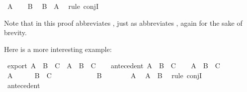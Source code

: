\begin{isabellebody}
\ {\isachardoublequoteopen}A{\isachardoublequoteclose}\isacommand{{\isachardot}{\isachardot}}\isamarkupfalse%
\isanewline
\ \ \isamarkupfalse%
\ {\isacharbackquoteopen}B{\isacharbackquoteclose}\ \isamarkupfalse%
\ {\isachardoublequoteopen}B\ {\isasymand}\ A{\isachardoublequoteclose}\ \isamarkupfalse%
\ {\isacharparenleft}rule\ conjI{\isacharparenright}\isanewline
{}\isamarkupfalse%
%
\endisatagproof
{\isafoldproof}%
%
\isadelimproof
%
\endisadelimproof
%
\begin{isamarkuptext}%
Note that  in this proof abbreviates , just as 
abbreviates , again for the sake of brevity.%
\end{isamarkuptext}\isamarkuptrue%
%
\begin{isamarkuptext}%
Here is a more interesting example:%
\end{isamarkuptext}\isamarkuptrue%
\isamarkupfalse%
\ export{\isacharcolon}\ {\isachardoublequoteopen}{\isacharparenleft}A\ {\isasymand}\ B\ {\isasymlongrightarrow}\ C{\isacharparenright}\ {\isasymlongrightarrow}\ {\isacharparenleft}A\ {\isasymlongrightarrow}\ B\ {\isasymlongrightarrow}\ C{\isacharparenright}{\isachardoublequoteclose}\isanewline
%
\isadelimproof
%
\endisadelimproof
%
\isatagproof
{}\isamarkupfalse%
\isanewline
\ \ \isamarkupfalse%
\ antecedent{\isacharcolon}\ {\isachardoublequoteopen}A\ {\isasymand}\ B\ {\isasymlongrightarrow}\ C{\isachardoublequoteclose}\isanewline
\ \ \isamarkupfalse%
\ {\isachardoublequoteopen}A\ {\isasymlongrightarrow}\ B\ {\isasymlongrightarrow}\ C{\isachardoublequoteclose}\isanewline
\ \ \isamarkupfalse%
\isanewline
\ \ \ \ \isamarkupfalse%
\ {\isachardoublequoteopen}A{\isachardoublequoteclose}\isanewline
\ \ \ \ \isamarkupfalse%
\ {\isachardoublequoteopen}B\ {\isasymlongrightarrow}\ C{\isachardoublequoteclose}\isanewline
\ \ \ \ \isamarkupfalse%
\isanewline
\ \ \ \ \ \ \isamarkupfalse%
\ {\isachardoublequoteopen}B{\isachardoublequoteclose}\isanewline
\ \ \ \ \ \ \isamarkupfalse%
\ {\isacharbackquoteopen}A{\isacharbackquoteclose}\ \isamarkupfalse%
\ {\isachardoublequoteopen}A\ {\isasymand}\ B{\isachardoublequoteclose}\ \isamarkupfalse%
\ {\isacharparenleft}rule\ conjI{\isacharparenright}\isanewline
\ \ \ \ \ \ \isamarkupfalse%
\ antecedent\ \isamarkupfalse%

\end{isabellebody}
